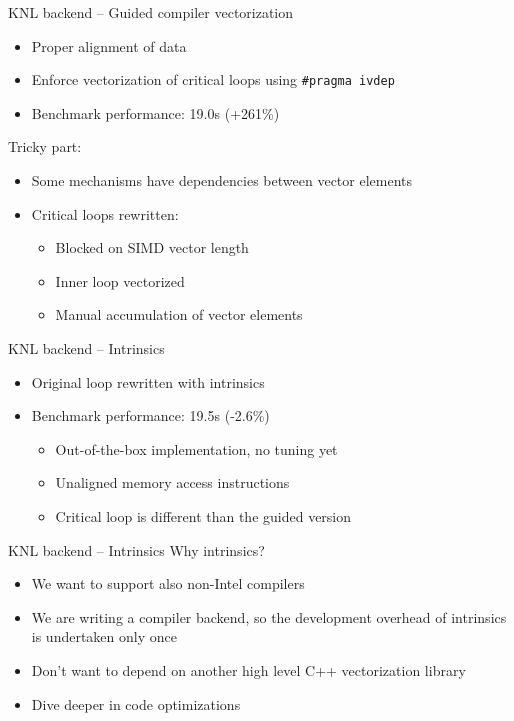 \documentclass[aspectratio=1610,14pt]{beamer}
\begin{document}
\begin{frame}{KNL backend -- Guided compiler vectorization}
  \begin{itemize}
  \item Proper alignment of data
  \item Enforce vectorization of critical loops using \texttt{\#pragma ivdep}
  \item Benchmark performance: {\color{cscsred} 19.0s (+261\%)}
  \end{itemize}
  \pause
  \vfill
  Tricky part:
  \vfill
  \begin{itemize}
  \item Some mechanisms have dependencies between vector elements
  \item Critical loops rewritten:
    \begin{itemize}
    \item Blocked on SIMD vector length
    \item Inner loop vectorized
    \item Manual accumulation of vector elements
    \end{itemize}
  \end{itemize}
\end{frame}

\begin{frame}{KNL backend -- Intrinsics}
  \begin{itemize}
  \item Original loop rewritten with intrinsics
  \item Benchmark performance: {\color{cscsred}19.5s (-2.6\%)}
    \begin{itemize}
    \item Out-of-the-box implementation, no tuning yet
    \item Unaligned memory access instructions
    \item Critical loop is different than the guided version
    \end{itemize}
  \end{itemize}
\end{frame}

\begin{frame}{KNL backend -- Intrinsics}
  Why intrinsics?
  \vfill
  \begin{itemize}
  \item We want to support also non-Intel compilers
  \item We are writing a compiler backend, so the development overhead of intrinsics is undertaken only once
  \item Don't want to depend on another high level C++ vectorization library
  \item Dive deeper in code optimizations
  \end{itemize}
\end{frame}
\end{document}
